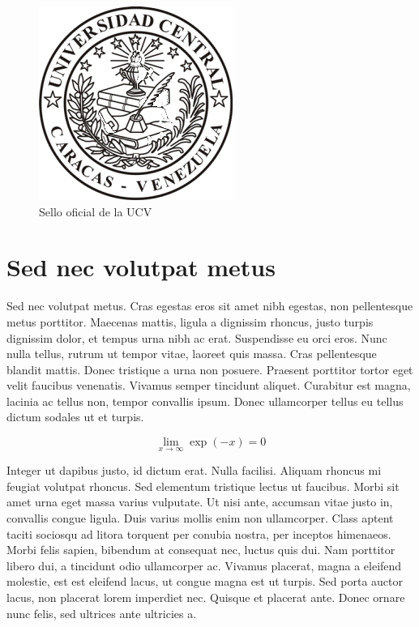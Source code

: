 \begin{figure}
\begin{center}
\includegraphics[scale=1]{EFUCVtesis/logoucvgifpeq.png}
\caption{Sello oficial de la UCV \label{selloUCV}}
\end{center}
\end{figure}

\section{Sed nec volutpat metus}
Sed nec volutpat metus. Cras egestas eros sit amet nibh egestas, non pellentesque metus porttitor. Maecenas mattis, ligula a dignissim rhoncus, justo turpis dignissim dolor, et tempus urna nibh ac erat. Suspendisse eu orci eros. Nunc nulla tellus, rutrum ut tempor vitae, laoreet quis massa. Cras pellentesque blandit mattis. Donec tristique a urna non posuere. Praesent porttitor tortor eget velit faucibus venenatis. Vivamus semper tincidunt aliquet. Curabitur est magna, lacinia ac tellus non, tempor convallis ipsum. Donec ullamcorper tellus eu tellus dictum sodales ut et turpis.

\begin{equation}
	\lim_{x \to \infty} \exp(-x) = 0
\end{equation}

Integer ut dapibus justo, id dictum erat. Nulla facilisi. Aliquam rhoncus mi feugiat volutpat rhoncus. Sed elementum tristique lectus ut faucibus. Morbi sit amet urna eget massa varius vulputate. Ut nisi ante, accumsan vitae justo in, convallis congue ligula. Duis varius mollis enim non ullamcorper. Class aptent taciti sociosqu ad litora torquent per conubia nostra, per inceptos himenaeos. Morbi felis sapien, bibendum at consequat nec, luctus quis dui. Nam porttitor libero dui, a tincidunt odio ullamcorper ac. Vivamus placerat, magna a eleifend molestie, est est eleifend lacus, ut congue magna est ut turpis. Sed porta auctor lacus, non placerat lorem imperdiet nec. Quisque et placerat ante. Donec ornare nunc felis, sed ultrices ante ultricies a. 

